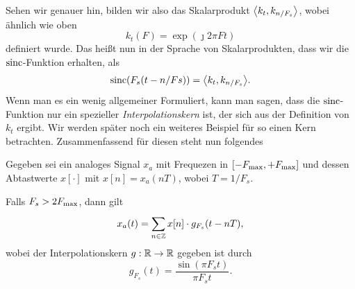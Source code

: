 Sehen wir genauer hin, bilden wir also das Skalarprodukt ${\left\langle k_t,k_{n/F_s} \right\rangle}$, wobei ähnlich wie oben
\[
k_t(F) = \exp(\jmath 2 \pi F t)
\]
definiert wurde.
Das heißt nun in der Sprache von Skalarprodukten, dass wir die $\operatorname*{sinc}$-Funktion erhalten, als
\[
    \operatorname*{sinc}(F_s (t - n/Fs)) = {\left\langle k_t,k_{n/F_s} \right\rangle}.
\]
Wenn man es ein wenig allgemeiner Formuliert, kann man sagen, dass die $\operatorname*{sinc}$-Funktion nur ein spezieller \emph{Interpolationskern} ist, der sich aus der Definition von $k_t$ ergibt.
Wir werden später noch ein weiteres Beispiel für so einen Kern betrachten. Zusammenfassend für diesen  steht nun folgendes
\begin{Thm}[Samplingtheorem]\label{stm:sampling_theorem}
Gegeben sei ein analoges Signal $x_a$ mit Frequezen in $[-F_{\rm max},+F_{\rm max}]$ und dessen Abtastwerte $x[\cdot]$ mit $x[n] = x_a(nT)$, wobei $T = 1/F_s$.

Falls $F_s > 2 F_{\rm max}$, dann gilt
\begin{equation}\label{eq:sampling_theorem}
    x_a(t) = {\sum\limits_{n \in \mathbb{Z}}^{}{
        x[n] \cdot g_{F_s}(t - n T),
    }}
\end{equation}
wobei der Interpolationskern $g : \mathbb{R} \rightarrow \mathbb{R}$ gegeben ist durch
\[
g_{F_s}(t) = \frac{\sin(\pi F_s t)}{\pi F_s t}.
\]
\end{Thm}

